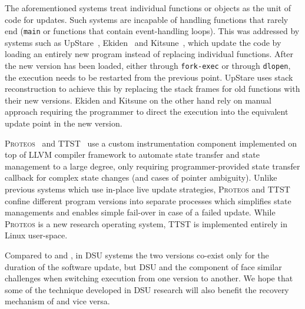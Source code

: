The aforementioned systems treat individual functions or objects as the unit of
code for updates. Such systems are incapable of handling functions that rarely
end (\eg \lstinline`main` or functions that contain event-handling loops). This
was addressed by systems such as UpStare~\cite{upstare}, Ekiden~\cite{ekiden}
and Kitsune~\cite{kitsune}, which update the code by loading an entirely new
program instead of replacing individual functions. After the new version has
been loaded, either through \lstinline`fork-exec` or through
\lstinline`dlopen`, the execution needs to be restarted from the previous
point. UpStare uses stack reconstruction to achieve this by replacing the stack
frames for old functions with their new versions. Ekiden and Kitsune on the
other hand rely on manual approach requiring the programmer to direct the
execution into the equivalent update point in the new version.

\textsc{Proteos}~\cite{proteos} and TTST~\cite{ttst} use a custom
instrumentation component implemented on top of LLVM compiler framework to
automate state transfer and state management to a large degree, only requiring
programmer-provided state transfer callback for complex state changes
(and cases of pointer ambiguity). Unlike previous systems which use in-place
live update strategies, \textsc{Proteos} and TTST confine different program
versions into separate processes which simplifies state managements and enables
simple fail-over in case of a failed update. While \textsc{Proteos} is a new
research operating system, TTST is implemented entirely in Linux user-space.

Compared to \mx and \varan, in DSU systems the two versions co-exist only for
the duration of the software update, but DSU and the \rem component of \mx face
similar challenges when switching execution from one version to another.  We
hope that some of the technique developed in DSU research will also benefit the
recovery mechanism of \mx and vice versa.


